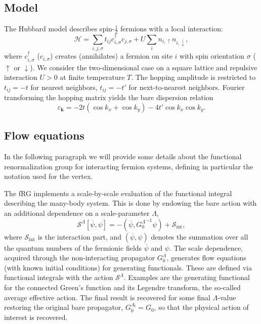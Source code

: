 
\subsection{Model}

The Hubbard model\cite{Montorsi1992} describes spin-$\frac{1}{2}$ fermions with a local interaction:
\begin{equation}
 \mathcal{H} = \sum_{i,j,\sigma} t_{ij} c^{\dagger}_{i,\sigma} c_{j,\sigma}
 + U \sum_{i} n_{i,\uparrow} n_{i,\downarrow} ,
\end{equation}
where $c^{\dagger}_{i,\sigma}$ ($c_{i,\sigma}$)  creates (annihilates) a fermion on site $i$ with spin orientation $\sigma$ ($\uparrow$ or $\downarrow$). We consider the two-dimensional case on a square lattice and repulsive interaction $U>0$ at finite temperature $T$. The hopping amplitude is restricted to $t_{ij} = -t$ for nearest neighbors, $t_{ij}=-t'$ for next-to-nearest neighbors. Fourier transforming the hopping matrix yields the bare dispersion relation
\begin{equation}
 \varepsilon_{\mathbf{k}} =
 -2t \left( \cos{k_x} + \cos{k_y} \right) -4 t' \cos{k_x} \cos{k_y} .
\end{equation}


\subsection{Flow equations}

In the following paragraph we will provide some details about the functional renormalization group for interacting fermion systems,\cite{Metzner2012,Platt2013} defining in particular the notation used for the vertex. 

The fRG implements a scale-by-scale evaluation of the functional integral describing the many-body system. 
This is done by endowing the bare action with an additional dependence on a scale-parameter $\Lambda$,
\begin{equation}
 \mathcal{S}^\Lambda[\overline\psi,\psi] =
 -(\overline\psi,{G_0^\Lambda}^{-1}\psi)+\mathcal{S}_{\mathrm{int}},  
\end{equation} 
where $\mathcal{S}_{\mathrm{int}}$ is the interaction part, and $(\overline\psi,\psi)$ denotes the summation over all the quantum numbers of the fermionic fields  $\overline \psi$ and $\psi$. 
The scale dependence, acquired through the non-interacting propagator $G_0^\Lambda$, generates flow equations (with known initial conditions) for generating functionals. These are defined via functional integrals with the action $\mathcal{S}^\Lambda$. 
Examples are the generating functional for the connected Green's function and its Legendre transform, the so-called average effective action.\cite{Wetterich1993}
The final result is recovered for some final $\Lambda$-value restoring the original bare propagator, $G_0^{\Lambda_\mathrm{f}} = G_0$, so that the physical action of interest is recovered.  

